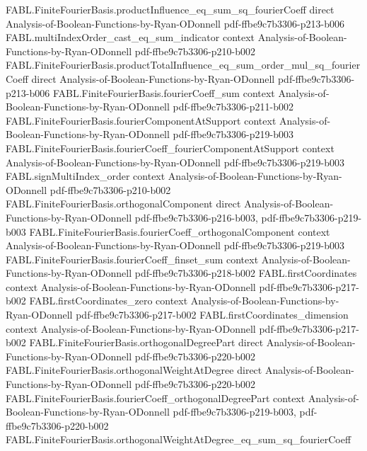 \begin{theorem}
  {FABL.FiniteFourierBasis.productInfluence_eq_sum_sq_fourierCoeff}
  {direct}
  {Analysis-of-Boolean-Functions-by-Ryan-ODonnell}
  {pdf-ffbe9c7b3306-p213-b006}
\proofstep
  {FABL.multiIndexOrder_cast_eq_sum_indicator}
  {context}
  {Analysis-of-Boolean-Functions-by-Ryan-ODonnell}
  {pdf-ffbe9c7b3306-p210-b002}
\proofstep
  {FABL.FiniteFourierBasis.productTotalInfluence_eq_sum_order_mul_sq_fourierCoeff}
  {direct}
  {Analysis-of-Boolean-Functions-by-Ryan-ODonnell}
  {pdf-ffbe9c7b3306-p213-b006}
\proofstep
  {FABL.FiniteFourierBasis.fourierCoeff_sum}
  {context}
  {Analysis-of-Boolean-Functions-by-Ryan-ODonnell}
  {pdf-ffbe9c7b3306-p211-b002}
\proofstep
  {FABL.FiniteFourierBasis.fourierComponentAtSupport}
  {context}
  {Analysis-of-Boolean-Functions-by-Ryan-ODonnell}
  {pdf-ffbe9c7b3306-p219-b003}
\proofstep
  {FABL.FiniteFourierBasis.fourierCoeff_fourierComponentAtSupport}
  {context}
  {Analysis-of-Boolean-Functions-by-Ryan-ODonnell}
  {pdf-ffbe9c7b3306-p219-b003}
\proofstep
  {FABL.signMultiIndex_order}
  {context}
  {Analysis-of-Boolean-Functions-by-Ryan-ODonnell}
  {pdf-ffbe9c7b3306-p210-b002}
\proofstep
  {FABL.FiniteFourierBasis.orthogonalComponent}
  {direct}
  {Analysis-of-Boolean-Functions-by-Ryan-ODonnell}
  {pdf-ffbe9c7b3306-p216-b003,
    pdf-ffbe9c7b3306-p219-b003}
\proofstep
  {FABL.FiniteFourierBasis.fourierCoeff_orthogonalComponent}
  {context}
  {Analysis-of-Boolean-Functions-by-Ryan-ODonnell}
  {pdf-ffbe9c7b3306-p219-b003}
\proofstep
  {FABL.FiniteFourierBasis.fourierCoeff_finset_sum}
  {context}
  {Analysis-of-Boolean-Functions-by-Ryan-ODonnell}
  {pdf-ffbe9c7b3306-p218-b002}
\proofstep
  {FABL.firstCoordinates}
  {context}
  {Analysis-of-Boolean-Functions-by-Ryan-ODonnell}
  {pdf-ffbe9c7b3306-p217-b002}
\proofstep
  {FABL.firstCoordinates_zero}
  {context}
  {Analysis-of-Boolean-Functions-by-Ryan-ODonnell}
  {pdf-ffbe9c7b3306-p217-b002}
\proofstep
  {FABL.firstCoordinates_dimension}
  {context}
  {Analysis-of-Boolean-Functions-by-Ryan-ODonnell}
  {pdf-ffbe9c7b3306-p217-b002}
\proofstep
  {FABL.FiniteFourierBasis.orthogonalDegreePart}
  {direct}
  {Analysis-of-Boolean-Functions-by-Ryan-ODonnell}
  {pdf-ffbe9c7b3306-p220-b002}
\proofstep
  {FABL.FiniteFourierBasis.orthogonalWeightAtDegree}
  {direct}
  {Analysis-of-Boolean-Functions-by-Ryan-ODonnell}
  {pdf-ffbe9c7b3306-p220-b002}
\proofstep
  {FABL.FiniteFourierBasis.fourierCoeff_orthogonalDegreePart}
  {context}
  {Analysis-of-Boolean-Functions-by-Ryan-ODonnell}
  {pdf-ffbe9c7b3306-p219-b003,
    pdf-ffbe9c7b3306-p220-b002}
\proofstep
  {FABL.FiniteFourierBasis.orthogonalWeightAtDegree_eq_sum_sq_fourierCoeff}

\end{theorem}
